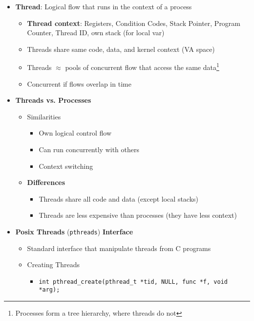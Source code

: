\documentclass[12pt]{article}
\begin{document}
{\begin{itemize}
\begin{itemize}
\begin{itemize}
					\item Too complex
					\item Hard to provide fine-grained concurrency
					\item Cannot take advantage of multi-core (single control)
				\end{itemize}
			\end{itemize}
			\item \textbf{Thread}: Logical flow that runs in the context of a process
			\begin{itemize}
				\item \textbf{Thread context}: Registers, Condition Codes, Stack Pointer, Program Counter, Thread ID, own stack (for local var)
				\item Threads share same code, data, and kernel context (VA space)
				\item Threads $\approx$ pools of concurrent flow that access the same data\footnote{Processes form a tree hierarchy, where threads do not}
				\item Concurrent if flows overlap in time
			\end{itemize}
			\item \textbf{Threads vs. Processes}
			\begin{itemize}
				\item Similarities
				\begin{itemize}
					\item Own logical control flow
					\item Can run concurrently with others
					\item Context switching
				\end{itemize}
				\item \textbf{Differences}
				\begin{itemize}
					\item Threads share all code and data (except local stacks)
					\item Threads are less expensive than processes (they have less context)
				\end{itemize}
			\end{itemize}
			\item \textbf{Posix Threads} (\texttt{pthreads}) \textbf{Interface}
			\begin{itemize}
				\item Standard interface that manipulate threads from C programs
				\item Creating Threads
				\begin{itemize}
					\item \texttt{int pthread\_create(pthread\_t *tid, NULL, func *f, void *arg);}

\end{itemize}
\end{itemize}
\end{itemize}}
\end{document}
